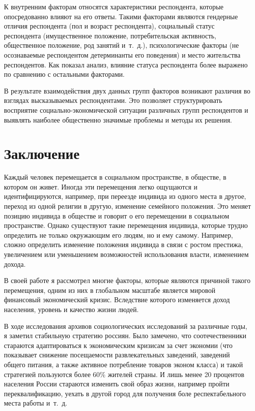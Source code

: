   К внутренним факторам относятся характеристики респондента, которые
  опосредованно влияют на его ответы. Такими факторами являются гендерные
  отличия респондента (пол и возраст респондента), социальный статус
  респондента (имущественное положение, потребительская активность,
  общественное положение, род занятий и~т.~д.), психологические факторы (не
  осознаваемые респондентом детерминанты его поведения) и место жительства
  респондентов. Как показал анализ, влияние статуса респондента более выражено
  по сравнению с остальными факторами.
  
  В результате взаимодействия двух данных групп факторов возникают различия во
  взглядах высказываемых респондентами. Это позволяет структурировать
  восприятие социально-экономической ситуации различных групп респондентов и
  выявлять наиболее общественно значимые проблемы и методы их решения.~\cite{v-v}

  \section*{Заключение}

  Каждый человек перемещается в социальном пространстве, в обществе, в котором
  он живет. Иногда эти перемещения легко ощущаются и идентифицируются,
  например, при переезде индивида из одного места в другое, переход из одной
  религии в другую, изменение семейного положения. Это меняет позицию индивида
  в обществе и говорит о его перемещении в социальном пространстве. Однако
  существуют такие перемещения индивида, которые трудно определить не только
  окружающим его людям, но и ему самому. Например, сложно определить изменение
  положения индивида в связи с ростом престижа, увеличением или уменьшением
  возможностей использования власти, изменением дохода. 
  
  В своей работе я рассмотрел многие факторы, которые являются причиной такого
  перемещения, одним из них в глобальном масштабе является мировой финансовый
  экономический кризис. Вследствие которого изменяется доход населения, уровень
  и качество жизни людей.
  
  В ходе исследования архивов социологических исследований за различные годы, я
  заметил стабильную стратегию россиян. Было замечено, что соотечественники
  стараются адаптироваться к экономическим кризисам за счет экономии (что
  показывает снижение посещаемости развлекательных заведений, заведений общего
  питания, а также активное потребление товаров эконом класса) и такой
  стратегией пользуются более 60\% жителей страны. И лишь менее 20 процентов
  населения России стараются изменить свой образ жизни, например пройти
  переквалификацию, уехать в другой город для получения боле респектабельного
  места работы и~т.~д.~\cite{vcpor}
  
